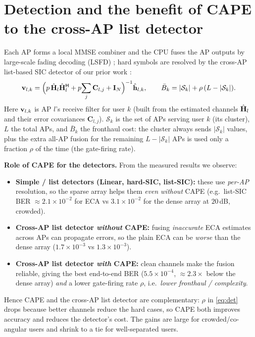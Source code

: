 \documentclass[11pt]{article}
\newcommand{\herm}{^{\mathsf{H}}}
\newcommand{\mC}{\mathbf{C}}\newcommand{\mI}{\mathbf{I}}\newcommand{\mR}{\mathbf{R}}
\begin{document}
\section{Detection and the benefit of CAPE to the cross-AP list detector}
Each AP forms a local MMSE combiner and the CPU fuses the AP outputs by large-scale fading decoding
(LSFD) \cite{bjornson2020scalable}; hard symbols are resolved by the cross-AP list-based SIC detector
of our prior work \cite{haider2026icassp,haider2026vtc}:
\begin{equation}
\vv_{l,k}=\Big(p\,\hat{\mH}_{l}\hat{\mH}_{l}\herm+p\!\sum_{j}\mC_{l,j}+\mI_{N}\Big)^{-1}\hat{\vh}_{l,k},
\qquad
\bar B_{k}=|\mathcal S_{k}|+\rho\,(L-|\mathcal S_{k}|).
\label{eq:det}
\end{equation}
%
{Here $\mathbf{v}_{l,k}$ is AP $l$'s receive filter for user $k$ (built from the estimated channels
$\hat{\mathbf{H}}_{l}$ and their error covariances $\mC_{l,j}$). $\mathcal S_{k}$ is the set of APs serving
user $k$ (its cluster), $L$ the total APs, and $\bar B_{k}$ the fronthaul cost: the cluster always
sends $|\mathcal S_{k}|$ values, plus the extra all-AP fusion for the remaining $L-|\mathcal S_{k}|$
APs is used only a fraction $\rho$ of the time (the gate-firing rate).}

\noindent\textbf{Role of CAPE for the detectors.} From the measured results we observe:
\begin{itemize}[leftmargin=1.4em,itemsep=1pt]
\item \textbf{Simple / list detectors (Linear, hard-SIC, list-SIC):} these use \emph{per-AP}
      resolution, so the sparse array helps them \emph{even without} CAPE (e.g.\ list-SIC BER $\approx
      2.1\times10^{-2}$ for ECA vs $3.1\times10^{-2}$ for the dense array at $20$\,dB, crowded).
\item \textbf{Cross-AP list detector \emph{without} CAPE:} fusing \emph{inaccurate} ECA estimates
      across APs can propagate errors, so the plain ECA can be \emph{worse} than the dense array
      ($1.7\times10^{-3}$ vs $1.3\times10^{-3}$).
\item \textbf{Cross-AP list detector \emph{with} CAPE:} clean channels make the fusion reliable,
      giving the best end-to-end BER ($5.5\times10^{-4}$, $\approx2.3\times$ below the dense array)
      \emph{and} a lower gate-firing rate $\rho$, i.e.\ \emph{lower fronthaul / complexity}.
\end{itemize}
Hence CAPE and the cross-AP list detector are complementary: $\rho$ in \eqref{eq:det} drops because
better channels reduce the hard cases, so CAPE both improves accuracy and reduces the detector's
cost. The gains are large for crowded/co-angular users and shrink to a tie for well-separated users.
\end{document}
